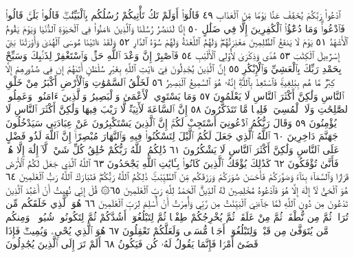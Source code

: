 ٱدْعُوا۟ رَبَّكُمْ يُخَفِّفْ عَنَّا يَوْمࣰا مِّنَ ٱلْعَذَابِ ٤٩
قَالُوٓا۟ أَوَلَمْ تَكُ تَأْتِيكُمْ رُسُلُكُم بِٱلْبَيِّنَٰتِۖ قَالُوا۟ بَلَىٰۚ
قَالُوا۟ فَٱدْعُوا۟ۗ وَمَا دُعَٰٓؤُا۟ ٱلْكَٰفِرِينَ إِلَّا فِي ضَلَٰلٍ ٥٠
إِنَّا لَنَنصُرُ رُسُلَنَا وَٱلَّذِينَ ءَامَنُوا۟ فِي ٱلْحَيَوٰةِ ٱلدُّنْيَا
وَيَوْمَ يَقُومُ ٱلْأَشْهَٰدُ ٥١ يَوْمَ لَا يَنفَعُ ٱلظَّٰلِمِينَ مَعْذِرَتُهُمْۖ
وَلَهُمُ ٱللَّعْنَةُ وَلَهُمْ سُوٓءُ ٱلدَّارِ ٥٢ وَلَقَدْ ءَاتَيْنَا مُوسَى
ٱلْهُدَىٰ وَأَوْرَثْنَا بَنِيٓ إِسْرَٰٓءِيلَ ٱلْكِتَٰبَ ٥٣ هُدࣰى
وَذِكْرَىٰ لِأُو۟لِي ٱلْأَلْبَٰبِ ٥٤ فَٱصْبِرْ إِنَّ وَعْدَ ٱللَّهِ
حَقࣱّ وَٱسْتَغْفِرْ لِذَنۢبِكَ وَسَبِّحْ بِحَمْدِ رَبِّكَ بِٱلْعَشِيِّ
وَٱلْإِبْكَٰرِ ٥٥ إِنَّ ٱلَّذِينَ يُجَٰدِلُونَ فِيٓ ءَايَٰتِ ٱللَّهِ
بِغَيْرِ سُلْطَٰنٍ أَتَىٰهُمْ إِن فِي صُدُورِهِمْ إِلَّا كِبْرࣱ
مَّا هُم بِبَٰلِغِيهِۚ فَٱسْتَعِذْ بِٱللَّهِۖ إِنَّهُۥ هُوَ ٱلسَّمِيعُ
ٱلْبَصِيرُ ٥٦ لَخَلْقُ ٱلسَّمَٰوَٰتِ وَٱلْأَرْضِ أَكْبَرُ مِنْ
خَلْقِ ٱلنَّاسِ وَلَٰكِنَّ أَكْثَرَ ٱلنَّاسِ لَا يَعْلَمُونَ ٥٧
وَمَا يَسْتَوِي ٱلْأَعْمَىٰ وَٱلْبَصِيرُ وَٱلَّذِينَ ءَامَنُوا۟ وَعَمِلُوا۟
ٱلصَّٰلِحَٰتِ وَلَا ٱلْمُسِيٓءُۚ قَلِيلࣰا مَّا تَتَذَكَّرُونَ ٥٨
إِنَّ ٱلسَّاعَةَ لَأٓتِيَةࣱ لَّا رَيْبَ فِيهَا وَلَٰكِنَّ أَكْثَرَ ٱلنَّاسِ
لَا يُؤْمِنُونَ ٥٩ وَقَالَ رَبُّكُمُ ٱدْعُونِيٓ أَسْتَجِبْ لَكُمْۚ
إِنَّ ٱلَّذِينَ يَسْتَكْبِرُونَ عَنْ عِبَادَتِي سَيَدْخُلُونَ جَهَنَّمَ
دَاخِرِينَ ٦٠ ٱللَّهُ ٱلَّذِي جَعَلَ لَكُمُ ٱلَّيْلَ لِتَسْكُنُوا۟
فِيهِ وَٱلنَّهَارَ مُبْصِرًاۚ إِنَّ ٱللَّهَ لَذُو فَضْلٍ عَلَى ٱلنَّاسِ وَلَٰكِنَّ
أَكْثَرَ ٱلنَّاسِ لَا يَشْكُرُونَ ٦١ ذَٰلِكُمُ ٱللَّهُ رَبُّكُمْ
خَٰلِقُ كُلِّ شَيْءࣲ لَّآ إِلَٰهَ إِلَّا هُوَۖ فَأَنَّىٰ تُؤْفَكُونَ ٦٢
كَذَٰلِكَ يُؤْفَكُ ٱلَّذِينَ كَانُوا۟ بِـَٔايَٰتِ ٱللَّهِ يَجْحَدُونَ ٦٣
ٱللَّهُ ٱلَّذِي جَعَلَ لَكُمُ ٱلْأَرْضَ قَرَارࣰا وَٱلسَّمَآءَ بِنَآءࣰ
وَصَوَّرَكُمْ فَأَحْسَنَ صُوَرَكُمْ وَرَزَقَكُم مِّنَ
ٱلطَّيِّبَٰتِۚ ذَٰلِكُمُ ٱللَّهُ رَبُّكُمْۖ فَتَبَارَكَ ٱللَّهُ رَبُّ
ٱلْعَٰلَمِينَ ٦٤ هُوَ ٱلْحَيُّ لَآ إِلَٰهَ إِلَّا هُوَ فَٱدْعُوهُ مُخْلِصِينَ
لَهُ ٱلدِّينَۗ ٱلْحَمْدُ لِلَّهِ رَبِّ ٱلْعَٰلَمِينَ ٦٥۞ قُلْ إِنِّي
نُهِيتُ أَنْ أَعْبُدَ ٱلَّذِينَ تَدْعُونَ مِن دُونِ ٱللَّهِ لَمَّا جَآءَنِيَ
ٱلْبَيِّنَٰتُ مِن رَّبِّي وَأُمِرْتُ أَنْ أُسْلِمَ لِرَبِّ ٱلْعَٰلَمِينَ ٦٦
هُوَ ٱلَّذِي خَلَقَكُم مِّن تُرَابࣲ ثُمَّ مِن نُّطْفَةࣲ ثُمَّ مِنْ عَلَقَةࣲ ثُمَّ
يُخْرِجُكُمْ طِفْلࣰا ثُمَّ لِتَبْلُغُوٓا۟ أَشُدَّكُمْ ثُمَّ لِتَكُونُوا۟ شُيُوخࣰاۚ
وَمِنكُم مَّن يُتَوَفَّىٰ مِن قَبْلُۖ وَلِتَبْلُغُوٓا۟ أَجَلࣰا مُّسَمࣰّى وَلَعَلَّكُمْ
تَعْقِلُونَ ٦٧ هُوَ ٱلَّذِي يُحْيِۦ وَيُمِيتُۖ فَإِذَا قَضَىٰٓ أَمْرࣰا فَإِنَّمَا
يَقُولُ لَهُۥ كُن فَيَكُونُ ٦٨ أَلَمْ تَرَ إِلَى ٱلَّذِينَ يُجَٰدِلُونَ
